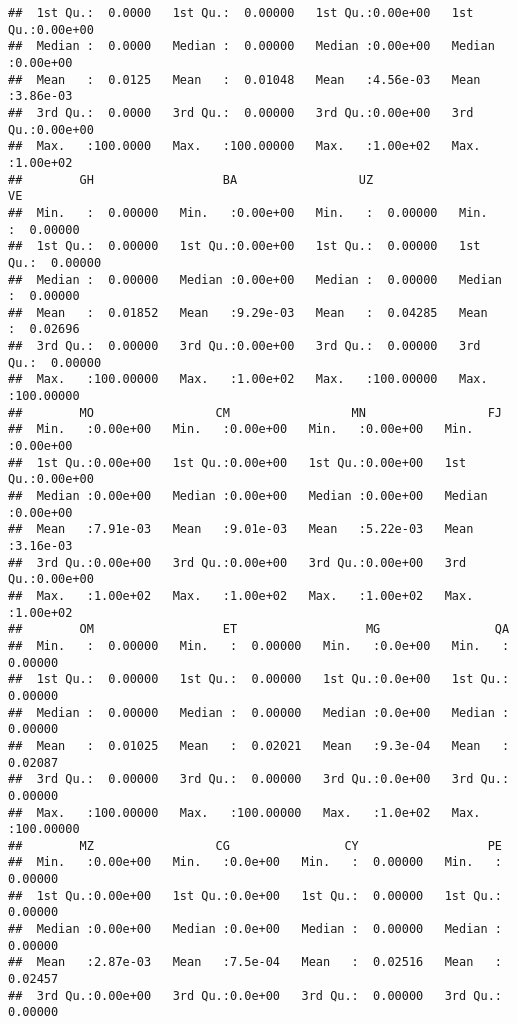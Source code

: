 \documentclass[
]{article}
\begin{document}
\begin{verbatim}
##  1st Qu.:  0.0000   1st Qu.:  0.00000   1st Qu.:0.00e+00   1st Qu.:0.00e+00  
##  Median :  0.0000   Median :  0.00000   Median :0.00e+00   Median :0.00e+00  
##  Mean   :  0.0125   Mean   :  0.01048   Mean   :4.56e-03   Mean   :3.86e-03  
##  3rd Qu.:  0.0000   3rd Qu.:  0.00000   3rd Qu.:0.00e+00   3rd Qu.:0.00e+00  
##  Max.   :100.0000   Max.   :100.00000   Max.   :1.00e+02   Max.   :1.00e+02  
##        GH                  BA                 UZ                  VE           
##  Min.   :  0.00000   Min.   :0.00e+00   Min.   :  0.00000   Min.   :  0.00000  
##  1st Qu.:  0.00000   1st Qu.:0.00e+00   1st Qu.:  0.00000   1st Qu.:  0.00000  
##  Median :  0.00000   Median :0.00e+00   Median :  0.00000   Median :  0.00000  
##  Mean   :  0.01852   Mean   :9.29e-03   Mean   :  0.04285   Mean   :  0.02696  
##  3rd Qu.:  0.00000   3rd Qu.:0.00e+00   3rd Qu.:  0.00000   3rd Qu.:  0.00000  
##  Max.   :100.00000   Max.   :1.00e+02   Max.   :100.00000   Max.   :100.00000  
##        MO                 CM                 MN                 FJ          
##  Min.   :0.00e+00   Min.   :0.00e+00   Min.   :0.00e+00   Min.   :0.00e+00  
##  1st Qu.:0.00e+00   1st Qu.:0.00e+00   1st Qu.:0.00e+00   1st Qu.:0.00e+00  
##  Median :0.00e+00   Median :0.00e+00   Median :0.00e+00   Median :0.00e+00  
##  Mean   :7.91e-03   Mean   :9.01e-03   Mean   :5.22e-03   Mean   :3.16e-03  
##  3rd Qu.:0.00e+00   3rd Qu.:0.00e+00   3rd Qu.:0.00e+00   3rd Qu.:0.00e+00  
##  Max.   :1.00e+02   Max.   :1.00e+02   Max.   :1.00e+02   Max.   :1.00e+02  
##        OM                  ET                  MG                QA           
##  Min.   :  0.00000   Min.   :  0.00000   Min.   :0.0e+00   Min.   :  0.00000  
##  1st Qu.:  0.00000   1st Qu.:  0.00000   1st Qu.:0.0e+00   1st Qu.:  0.00000  
##  Median :  0.00000   Median :  0.00000   Median :0.0e+00   Median :  0.00000  
##  Mean   :  0.01025   Mean   :  0.02021   Mean   :9.3e-04   Mean   :  0.02087  
##  3rd Qu.:  0.00000   3rd Qu.:  0.00000   3rd Qu.:0.0e+00   3rd Qu.:  0.00000  
##  Max.   :100.00000   Max.   :100.00000   Max.   :1.0e+02   Max.   :100.00000  
##        MZ                 CG                CY                  PE           
##  Min.   :0.00e+00   Min.   :0.0e+00   Min.   :  0.00000   Min.   :  0.00000  
##  1st Qu.:0.00e+00   1st Qu.:0.0e+00   1st Qu.:  0.00000   1st Qu.:  0.00000  
##  Median :0.00e+00   Median :0.0e+00   Median :  0.00000   Median :  0.00000  
##  Mean   :2.87e-03   Mean   :7.5e-04   Mean   :  0.02516   Mean   :  0.02457  
##  3rd Qu.:0.00e+00   3rd Qu.:0.0e+00   3rd Qu.:  0.00000   3rd Qu.:  0.00000  

\end{verbatim}
\end{document}
